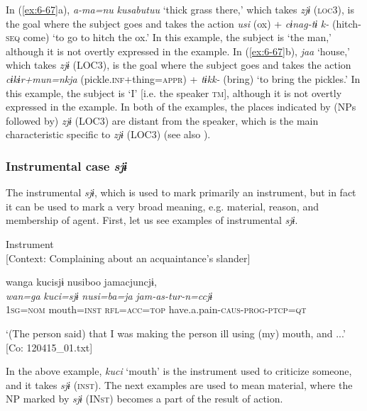 \begin{table}
In (\ref{ex:6-67}a), \textit{a-ma=nu} \textit{kusabutuu} ‘thick grass there,’ which takes \textit{zjɨ} (\textsc{loc}3), is the goal where the subject goes and takes the action \textit{usi} (ox) + \textit{cɨnag-tɨ} \textit{k-} (hitch-\textsc{seq} come) ‘to go to hitch the ox.’ In this example, the subject is ‘the man,’ although it is not overtly expressed in the example. In (\ref{ex:6-67}b), \textit{jaa} ‘house,’ which takes \textit{zjɨ} (LOC3), is the goal where the subject goes and takes the action \textit{cɨkɨr+mun=nkja} (pickle.\textsc{inf}+thing=\textsc{appr}) + \textit{tɨkk-} (bring) ‘to bring the pickles.’ In this example, the subject is ‘I’ [i.e. the speaker \textsc{tm}], although it is not overtly expressed in the example. In both of the examples, the places indicated by (NPs followed by) \textit{zjɨ} (LOC3) are distant from the speaker, which is the main characteristic specific to \textit{zjɨ} (LOC3) (see also ).

\subsubsection{Instrumental case \textit{sjɨ}}

The instrumental \textit{sjɨ}, which is used to mark primarily an instrument, but in fact it can be used to mark a very broad meaning, e.g. material, reason, and membership of agent. First, let us see examples of instrumental \textit{sjɨ}.

\ea\label{ex:6-68}
 Instrument\\{}
[Context: Complaining about an acquaintance’s slander]

{\TM}
\glll wanga  kucisjɨ  nusiboo  jamacjuncjɨ,\\
\textit{wan=ga}  \textit{kuci=sjɨ}  \textit{nusi=ba=ja}  \textit{jam-as-tur-n=ccjɨ}\\

    1\textsc{sg}=\textsc{nom}  mouth=\textsc{inst}  \textsc{rfl}=\textsc{acc}=\textsc{top}  have.a.pain-\textsc{caus}-\textsc{prog}-\textsc{ptcp}=\textsc{qt}

\glt    ‘(The person\textit{\textsubscript{} }said) that I was making the person ill using (my) mouth, and ...’ [Co: 120415\_01.txt]
\z

In the above example, \textit{kuci} ‘mouth’ is the instrument used to criticize someone, and it takes \textit{sjɨ} (\textsc{inst}). The next examples are used to mean material, where the NP marked by \textit{sjɨ} (IN\textsc{st}) becomes a part of the result of action.


\end{table}

